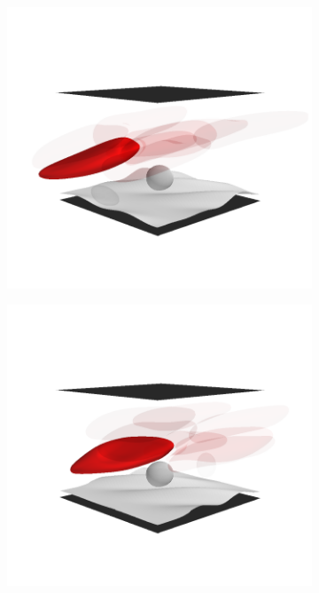 \begin{figure}[tbp]
    \begin{subfigure}[t]{0.5\textwidth}
        \includegraphics[trim=50 75 50 125, clip, width=\textwidth]{figures/unicycle1.png}
    \end{subfigure}%
    \begin{subfigure}[t]{0.5\textwidth}
        \includegraphics[trim=50 75 50 125, clip, width=\textwidth]{figures/unicycle2.png}
    \end{subfigure}


\end{figure}
